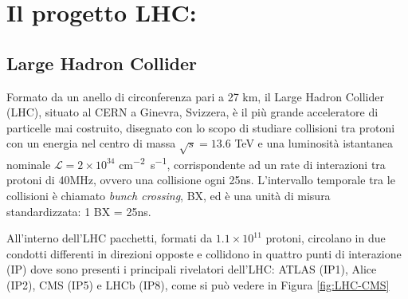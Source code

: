 \chapter{Il progetto LHC:}


\section{Large Hadron Collider}
Formato da un anello di circonferenza pari a 27 km, il Large Hadron Collider (LHC), situato al CERN a Ginevra, Svizzera, è il più grande acceleratore di particelle mai costruito, disegnato con lo scopo di studiare collisioni tra protoni con un energia nel centro di massa $\sqrt{s} = 13.6$ TeV e una luminosità istantanea nominale $\mathcal{L} = 2 \times 10^{34}$ \si{cm^{-2} s^{-1}}, corrispondente ad un rate di interazioni tra protoni di 40MHz, ovvero una collisione ogni 25ns. L'intervallo temporale tra le collisioni è chiamato \textit{bunch crossing}, BX, ed è una unità di misura standardizzata: 1 BX = 25ns.

All'interno dell'LHC pacchetti, formati da $1.1 \times 10^{11}$ protoni, circolano in due condotti differenti in direzioni opposte e collidono in quattro punti di interazione (IP) dove sono presenti i principali rivelatori dell'LHC: ATLAS (IP1), Alice (IP2), CMS (IP5) e LHCb (IP8), come si può vedere in Figura \ref{fig:LHC-CMS}

